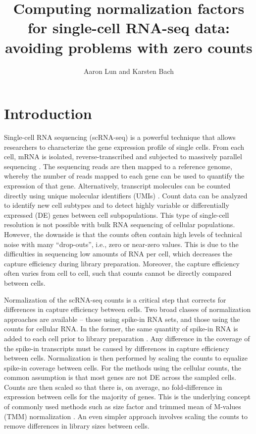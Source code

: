 \documentclass{article}
\title{Computing normalization factors for single-cell RNA-seq data: avoiding problems with zero counts}
\author{Aaron Lun and Karsten Bach}
\begin{document}
\maketitle

\section{Introduction}
Single-cell RNA sequencing (scRNA-seq) is a powerful technique that allows researchers to characterize the gene expression profile of single cells.
From each cell, mRNA is isolated, reverse-transcribed and subjected to massively parallel sequencing \cite{stegle2015computational}.
The sequencing reads are then mapped to a reference genome, whereby the number of reads mapped to each gene can be used to quantify the expression of that gene.
Alternatively, transcript molecules can be counted directly using unique molecular identifiers (UMIs) \cite{islam2014quantitative}.
Count data can be analyzed to identify new cell subtypes and to detect highly variable or differentially expressed (DE) genes between cell subpopulations.
This type of single-cell resolution is not possible with bulk RNA sequencing of cellular populations.
However, the downside is that the counts often contain high levels of technical noise with many ``drop-outs'', i.e., zero or near-zero values.
This is due to the difficulties in sequencing low amounts of RNA per cell, which decreases the capture efficiency during library preparation.
Moreover, the capture efficiency often varies from cell to cell, such that counts cannot be directly compared between cells.

Normalization of the scRNA-seq counts is a critical step that corrects for differences in capture efficiency between cells.
Two broad classes of normalization approaches are available -- those using spike-in RNA sets, and those using the counts for cellular RNA.
In the former, the same quantity of spike-in RNA is added to each cell prior to library preparation \cite{stegle2015computational}.
Any difference in the coverage of the spike-in transcripts must be caused by differences in capture efficiency between cells.
Normalization is then performed by scaling the counts to equalize spike-in coverage between cells.
For the methods using the cellular counts, the common assumption is that most genes are not DE across the sampled cells.
Counts are then scaled so that there is, on average, no fold-difference in expression between cells for the majority of genes.
This is the underlying concept of commonly used methods such as size factor \cite{anders2010differential} and trimmed mean of M-values (TMM) normalization \cite{robinson2010scaling}.
An even simpler approach involves scaling the counts to remove differences in library sizes between cells.
\end{document}
